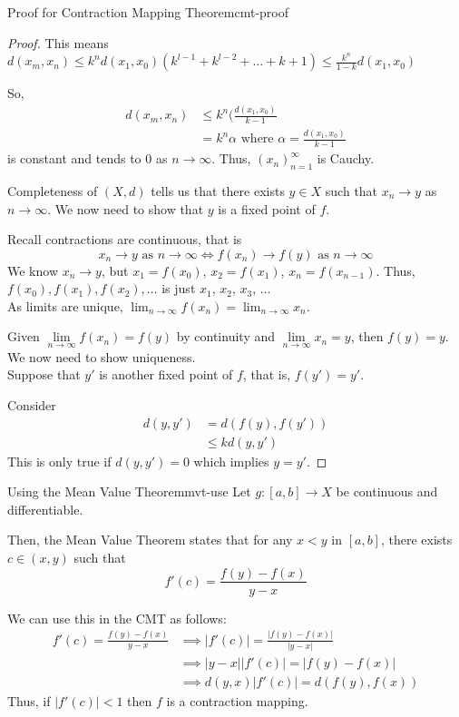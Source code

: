 \documentclass{article}
\numberwithin{equation}{section}
\numberwithin{figure}{section}
\begin{document}
\begin{theorem}{Proof for Contraction Mapping Theorem}{cmt-proof}
\begin{proof}
        This means $d(x_m, x_n)\leq k^nd(x_1,x_0)(k^{l-1}+k^{l-2}+\dots+k+ 1) \leq \frac{k^n}{1-k}d(x_1,x_0)$

        So, 
        \begin{align}
            d(x_m, x_n) &\leq k^n(\frac{d(x_1,x_0)}{k-1}\\
            &= k^n\alpha \text{ where } \alpha = \frac{d(x_1,x_0)}{k-1} 
        \end{align}
        is constant and tends to $0$ as $n \to \infty$. Thus, $(x_n)^\infty_{n=1}$ is Cauchy. 

        Completeness of $(X,d)$ tells us that there exists $y \in X$ such that $x_n \to y$ as $n \to \infty$.
        We now need to show that $y$ is a fixed point of $f$.

        Recall contractions are continuous, that is
        \begin{equation}
            x_n \to y \text{ as } n \to \infty  \iff f(x_n)\to f(y) \text{ as } n \to \infty 
        \end{equation}
        We know $x_n \to y$, but $x_1 = f(x_0)$, $x_2 = f(x_1)$, $x_n = f(x_{n-1})$. Thus, $f(x_0), f(x_1), f(x_2),\dots$ is just $x_1$, $x_2$, $x_3$, $\dots$\\
        As limits are unique, $\lim_{n\to\infty}f(x_n) = \lim_{n\to\infty}x_n$. 
        
        Given $\lim\limits_{n\to\infty}f(x_n) = f(y)$ by continuity and $\lim\limits_{n\to\infty}x_n=y$, then $f(y)=y$.\\

        We now need to show uniqueness. \\
        Suppose that $y'$ is another fixed point of $f$, that is, $f(y')=y'$.
        
        Consider 
        \begin{align}
            d(y,y')&=d(f(y), f(y')) \\
            &\leq kd(y,y')
        \end{align}
        This is only true if $d(y, y')=0$ which implies $y=y'$.
    \end{proof}
\end{theorem}
\begin{definition}{Using the Mean Value Theorem}{mvt-use}
    Let $g: [a,b] \to X$ be continuous and differentiable.

    Then, the Mean Value Theorem states that for any $x<y$ in $[a,b]$, there exists $c \in (x,y)$ such that \begin{equation}
        f'(c) = \frac{f(y)-f(x)}{y-x}
    \end{equation}

    We can use this in the CMT as follows:
    \begin{align}
        f'(c) = \frac{f(y)-f(x)}{y-x} &\implies |f'(c)| = \frac{|f(y)-f(x)|}{|y-x|} \\
        &\implies |y-x||f'(c)| = |f(y)-f(x)|\\
        &\implies d(y,x)|f'(c)|=d(f(y),f(x))
    \end{align}
    Thus, if $|f'(c)| < 1$ then $f$ is a contraction mapping.
\end{definition}
\end{document}
